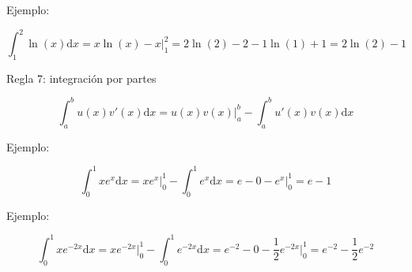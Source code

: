 \documentclass[11pt]{article}
\begin{document}
Ejemplo:

\[
\int_1^2 \ln(x) \text{d}x = x\ln(x) - x \Big|_1^2 = 2\ln(2) - 2 - 1\ln(1) + 1 = 2\ln(2) - 1
\]

Regla 7: integración por partes

\[
\int_a^b u(x)v'(x) \text{d}x = u(x)v(x) \Big|_a^b - \int_a^b u'(x)v(x) \text{d}x
\]

Ejemplo:

\[
\int_0^1 x e^x \text{d}x = xe^x \Big|_0^1 - \int_0^1 e^x \text{d}x = e - 0 - e^x \Big|_0^1 = e - 1
\]

Ejemplo:

\[
\int_0^1 x e^{-2x} \text{d}x = xe^{-2x} \Big|_0^1 - \int_0^1 e^{-2x} \text{d}x = e^{-2} - 0 - \frac{1}{2}e^{-2x} \Big|_0^1 = e^{-2} - \frac{1}{2}e^{-2}
\]


    
    
    
\end{document}
